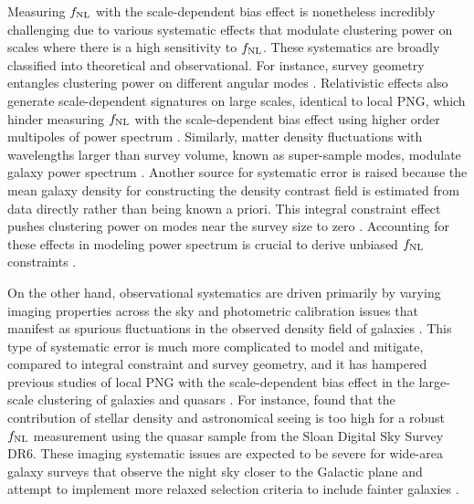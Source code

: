 Measuring $f_{\rm NL}$ with the scale-dependent bias effect is nonetheless incredibly challenging due to various systematic effects that modulate clustering power on scales where there is a high sensitivity to $f_{\rm NL}$. These systematics are broadly classified into theoretical and observational. For instance, survey geometry entangles clustering power on different angular modes \citep{beutler2014clustering,wilson2017rapid}. Relativistic effects also generate scale-dependent signatures on large scales, identical to local PNG, which hinder measuring $f_{\rm NL}$ with the scale-dependent bias effect using higher order multipoles of power spectrum \citep{wang2020}. Similarly, matter density fluctuations with wavelengths larger than survey volume, known as super-sample modes, modulate galaxy power spectrum \citep{castorina2020JCAP}. Another source for systematic error is raised because the mean galaxy density for constructing the density contrast field is estimated from data directly rather than being known a priori. This integral constraint effect pushes clustering power on modes near the survey size to zero \citep{peacock1991large,de2019integral}. Accounting for these effects in modeling power spectrum is crucial to derive unbiased $f_{\rm NL}$ constraints \citep[see, e.g.,][]{riquelme2022primordial}. 

On the other hand, observational systematics are driven primarily by varying imaging properties across the sky \citep{ross2011} and photometric calibration issues that manifest as spurious fluctuations in the observed density field of galaxies \citep{huterer2013calibration}. This type of systematic error is much more complicated to model and mitigate, compared to integral constraint and survey geometry, and it has hampered previous studies of local PNG with the scale-dependent bias effect in the large-scale clustering of galaxies and quasars \citep[see, e.g.,][]{Ho2015JCAP...05..040H}. For instance, \cite{pullen2013systematic} found that the contribution of stellar density and astronomical seeing is too high for a robust $f_{\rm NL}$ measurement using the quasar sample from the Sloan Digital Sky Survey DR6. These imaging systematic issues are expected to be severe for wide-area galaxy surveys that observe the night sky closer to the Galactic plane and attempt to implement more relaxed selection criteria to include fainter galaxies \citep[see, e.g,][]{kitanidis2020imaging}. 

